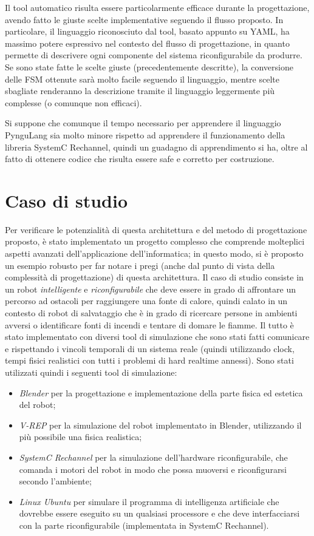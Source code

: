 \documentclass[a4paper,titlepage]{book}
\begin{document}
Il tool automatico risulta essere particolarmente efficace durante la progettazione, avendo fatto le giuste scelte implementative seguendo il flusso proposto. In particolare, il linguaggio riconosciuto dal tool, basato appunto su YAML, ha massimo potere espressivo nel contesto del flusso di progettazione, in quanto permette di descrivere ogni componente del sistema riconfigurabile da produrre. Se sono state fatte le scelte giuste (precedentemente descritte), la conversione delle FSM ottenute sarà molto facile seguendo il linguaggio, mentre scelte sbagliate renderanno la descrizione tramite il linguaggio leggermente più complesse (o comunque non efficaci).

Si suppone che comunque il tempo necessario per apprendere il linguaggio PynguLang sia molto minore rispetto ad apprendere il funzionamento della libreria SystemC Rechannel, quindi un guadagno di apprendimento si ha, oltre al fatto di ottenere codice che risulta essere safe e corretto per costruzione.



\chapter{Caso di studio}

Per verificare le potenzialità di questa architettura e del metodo di progettazione proposto, è stato implementato un progetto complesso che comprende molteplici aspetti avanzati dell'applicazione dell'informatica; in questo modo, si è proposto un esempio robusto per far notare i pregi (anche dal punto di vista della complessità di progettazione) di questa architettura.
Il caso di studio consiste in un robot \textit{intelligente} e \textit{riconfigurabile} che deve essere in grado di affrontare un percorso ad ostacoli per raggiungere una fonte di calore, quindi calato in un contesto di robot di salvataggio che è in grado di ricercare persone in ambienti avversi o identificare fonti di incendi e tentare di domare le fiamme. Il tutto è stato implementato con diversi tool di simulazione che sono stati fatti comunicare e rispettando i vincoli temporali di un sistema reale (quindi utilizzando clock, tempi fisici realistici con tutti i problemi di hard realtime annessi).
Sono stati utilizzati quindi i seguenti tool di simulazione:

\begin{itemize}
  \item \textit{Blender} per la progettazione e implementazione della parte fisica ed estetica del robot;
  \item \textit{V-REP} per la simulazione del robot implementato in Blender, utilizzando il più possibile una fisica realistica;
  \item \textit{SystemC Rechannel} per la simulazione dell'hardware riconfigurabile, che comanda i motori del robot in modo che possa muoversi e riconfigurarsi secondo l'ambiente;
  \item \textit{Linux Ubuntu} per simulare il programma di intelligenza artificiale che dovrebbe essere eseguito su un qualsiasi processore e che deve interfacciarsi con la parte riconfigurabile (implementata in SystemC Rechannel).
\end{itemize}
\end{document}
